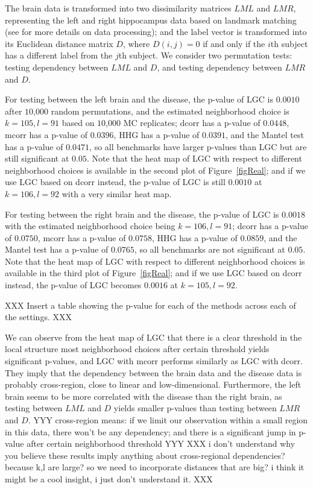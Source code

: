 \documentclass[11pt]{article}
\begin{document}
The brain data is transformed into two dissimilarity matrices $LML$ and $LMR$, representing the left and right hippocampus data based on landmark matching (see \cite{ParkEtAl2011} for more details on data processing); and the label vector is transformed into its Euclidean distance matrix $D$, where $D(i,j)=0$ if and only if the $i$th subject has a different label from the $j$th subject. We consider two permutation tests: testing dependency between $LML$ and $D$, and testing dependency between $LMR$ and $D$.

For testing between the left brain and the disease, the p-value of LGC is $0.0010$ after $10$,$000$ random permutations, and the estimated neighborhood choice is $k=105,l=91$ based on $10$,$000$ MC replicates; dcorr has a p-value of $0.0448$, mcorr has a p-value of $0.0396$, HHG has a p-value of $0.0391$, and the Mantel test has a p-value of $0.0471$, so all benchmarks have larger p-values than LGC but are still significant at $0.05$. Note that the heat map of LGC with respect to different neighborhood choices is available in the second plot of Figure~\ref{figReal}; and if we use LGC based on dcorr instead, the p-value of LGC is still $0.0010$ at $k=106,l=92$ with a very similar heat map.

For testing between the right brain and the disease, the p-value of LGC is $0.0018$ with the estimated neighborhood choice being $k=106,l=91$; dcorr has a p-value of $0.0750$, mcorr has a p-value of $0.0758$, HHG has a p-value of $0.0859$, and the Mantel test has a p-value of $0.0765$, so all benchmarks are not significant at $0.05$. Note that the heat map of LGC with respect to different neighborhood choices is available in the third plot of Figure~\ref{figReal}; and if we use LGC based on dcorr instead, the p-value of LGC becomes $0.0016$ at $k=105,l=92$.

XXX Insert a table showing the p-value for each of the methods across each of the settings. XXX

We can observe from the heat map of LGC that there is a clear threshold in the local structure most neighborhood choices after certain threshold yields significant p-values, and LGC with mcorr performs similarly as LGC with dcorr. They imply that the dependency between the brain data and the disease data is probably cross-region, close to linear and low-dimensional. Furthermore, the left brain seems to be more correlated with the disease than the right brain, as testing between $LML$ and $D$ yields smaller p-values than testing between $LMR$ and $D$.
YYY cross-region means: if we limit our observation within a small region in this data, there won't be any dependency; and there is a significant jump in p-value after certain neighborhood threshold YYY XXX i don't understand why you believe these results imply anything about cross-regional dependencies? because k,l are large? so we need to incorporate distances that are big? i think it might be a cool insight, i just don't understand it. XXX
\end{document}
